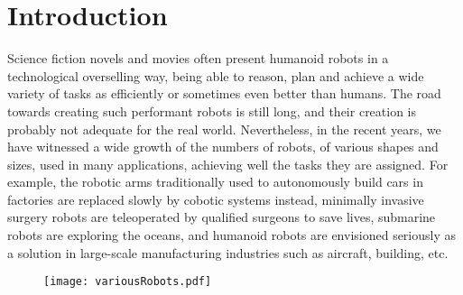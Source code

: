 


\chapter*{Introduction}
\label{cha:introduction}

\graphicspath{{Chapter0-Introduction/Figs/Vector/}{Chapter0-Introduction/Figs/}}

Science fiction novels and movies often present humanoid robots in a technological overselling way, being able to reason, plan and achieve a wide variety of tasks as efficiently or sometimes even better than humans.
The road towards creating such performant robots is still long, and their creation is probably not adequate for the real world.
Nevertheless, in the recent years, we have witnessed a wide growth of the numbers of robots, of various shapes and sizes, used in many applications, achieving well the tasks they are assigned.
For example, the robotic arms traditionally used to autonomously build cars in factories are replaced slowly by cobotic systems instead, minimally invasive surgery robots are teleoperated by qualified surgeons to save lives, submarine robots are exploring the oceans, and humanoid robots are envisioned seriously as a solution in large-scale manufacturing industries such as aircraft, building, etc.

\begin{figure}[ht]
  \centering
  \texttt{[image: variousRobots.pdf]}
\label{fig:various}
\end{figure}

